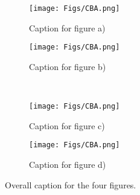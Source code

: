 \begin{figure}
  \centering
  \begin{subfigure}[b]{0.45\textwidth}
    \texttt{[image: Figs/CBA.png]}
    \caption{Caption for figure a)}
  \end{subfigure}
  \hfill
  \begin{subfigure}[b]{0.45\textwidth}
    \texttt{[image: Figs/CBA.png]}
    \caption{Caption for figure b)}
  \end{subfigure}
  \\
  \begin{subfigure}[b]{0.45\textwidth}
    \texttt{[image: Figs/CBA.png]}
    \caption{Caption for figure c)}
  \end{subfigure}
  \hfill
  \begin{subfigure}[b]{0.45\textwidth}
    \texttt{[image: Figs/CBA.png]}
    \caption{Caption for figure d)}
  \end{subfigure}
  \caption{Overall caption for the four figures.}
  \label{fig:four-figures}
\end{figure}